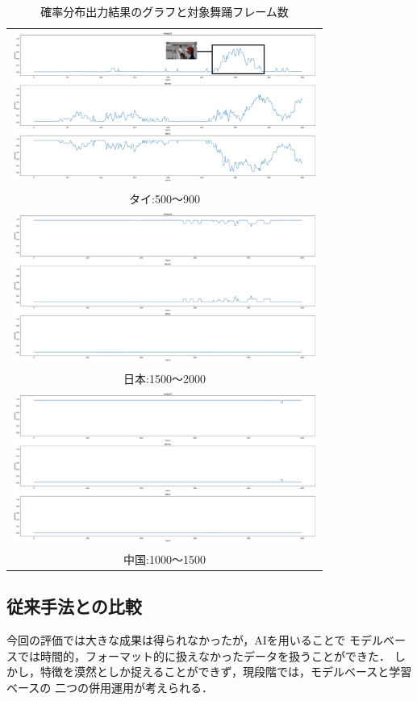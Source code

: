 \begin{table}[b]
  \begin{center}
    \begin{tabular}{|c|} \hline
      \includegraphics[width=100mm]{images/dist/thai_elegant_900.pdf} \\ タイ:500〜900 \\ \hline
      \includegraphics[width=100mm]{images/dist/japanese_elegant_2000.pdf} \\ 日本:1500〜2000 \\ \hline
      \includegraphics[width=100mm]{images/dist/chinese_elegant_1500.pdf} \\ 中国:1000〜1500 \\ \hline
    \end{tabular}
  \end{center}
  \caption{確率分布出力結果のグラフと対象舞踊フレーム数}
  \label{net_dist}
\end{table}
\clearpage

\subsection{従来手法との比較}
今回の評価では大きな成果は得られなかったが，AIを用いることで
モデルベースでは時間的，フォーマット的に扱えなかったデータを扱うことができた．
しかし，特徴を漠然としか捉えることができず，現段階では，モデルベースと学習ベースの
二つの併用運用が考えられる．

